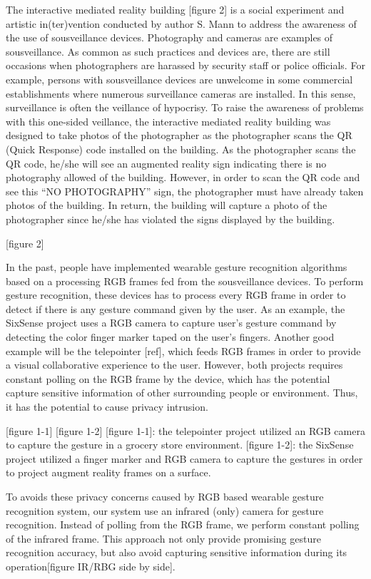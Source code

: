 \documentclass[conference]{IEEEtran}
\begin{document}
The interactive mediated reality building [figure 2] is a social experiment and artistic in(ter)vention conducted by author S. Mann to address the awareness of the use of sousveillance devices. Photography and cameras are examples of sousveillance. As common as such practices and devices are, there are still occasions when photographers are harassed by security staff or police officials. For example, persons with sousveillance devices are unwelcome in some commercial establishments where numerous surveillance cameras are installed.  In this sense, surveillance is often the veillance of hypocrisy. To raise the awareness of problems with this one-sided veillance, the interactive mediated reality building was designed to take photos of the photographer as the photographer scans the QR (Quick Response) code installed on the building. As the photographer scans the QR code, he/she will see an augmented reality sign indicating there is no photography allowed of the building. However, in order to scan the QR code and see this “NO PHOTOGRAPHY” sign, the photographer must have already taken photos of the building. In return, the building will capture a photo of the photographer since he/she has violated the signs displayed by the building. 

[figure 2]

In the past, people have implemented wearable gesture recognition algorithms based on a processing RGB frames fed from the sousveillance devices. To perform gesture recognition, these devices has to process every RGB frame in order to detect if there is any gesture command given by the user. As an example, the SixSense project uses a RGB camera to capture user's gesture command by detecting the color finger marker taped on the user's fingers. Another good example will be the telepointer [ref], which feeds RGB frames in order to provide a visual collaborative experience to the user.  However, both projects requires constant polling on the RGB frame by the device, which has the potential capture sensitive information of other surrounding people or environment. Thus, it has the potential to cause privacy intrusion. 

[figure 1-1] [figure 1-2]
[figure 1-1]: the telepointer project utilized an RGB camera to capture the gesture in a grocery store environment.
[figure 1-2]: the SixSense project utilized a finger marker and RGB camera to capture the gestures in order to project augment reality frames on a surface.

To avoids these privacy concerns caused by RGB based wearable gesture recognition system, our system use an infrared (only) camera for gesture recognition.  Instead of polling from the RGB frame, we perform constant polling of the infrared frame. This approach not only provide promising gesture recognition accuracy, but also avoid capturing sensitive information during its operation[figure IR/RBG side by side]. 
\end{document}
